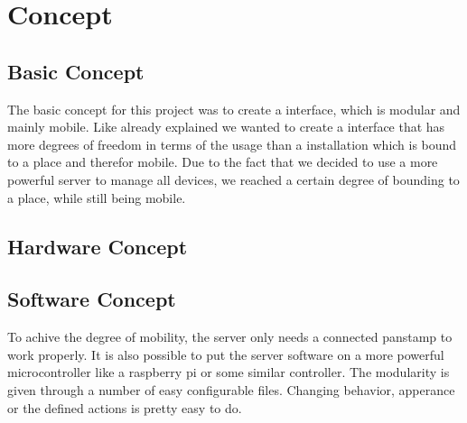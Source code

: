 \section{Concept}

\subsection{Basic Concept}
The basic concept for this project was to create a interface, which is modular and mainly mobile. Like already explained we wanted to create a interface that has more degrees of freedom in terms of the usage than a installation which is bound to a place and therefor mobile. Due to the fact that we decided to use a more powerful server to manage all devices, we reached a certain degree of bounding to a place, while still being mobile. 

\subsection{Hardware Concept}

\subsection{Software Concept} 
To achive the degree of mobility, the server only needs a connected panstamp to work properly. It is also possible to put the server software on a more powerful microcontroller like a raspberry pi or some similar controller.
The modularity is given through a number of easy configurable files. Changing behavior, apperance or the defined actions is pretty easy to do.

